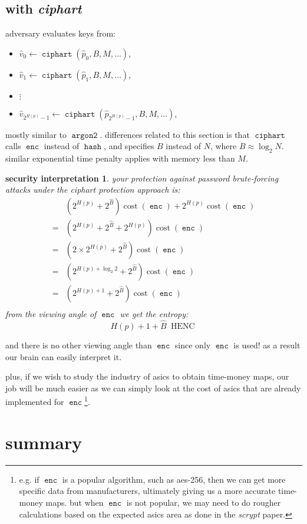 \documentclass[twocolumn]{article}
\newtheorem{security}{security interpretation}
\DeclareMathOperator{\enc}{\mathtt{enc}}
\DeclareMathOperator{\hash}{\mathtt{hash}}
\DeclareMathOperator{\argon}{\mathtt{argon2}}
\DeclareMathOperator{\ciphart}{\mathtt{ciphart}}
\DeclareMathOperator{\cost}{cost}
\DeclareMathOperator{\henc}{\; HENC}
\begin{document}
\subsection{with \emph{ciphart}}
adversary evaluates keys from:
\begin{itemize}
    \item $\hat v_0 \gets \ciphart(\hat p_0, B, M, \ldots)$,
    \item $\hat v_1 \gets \ciphart(\hat p_1, B, M, \ldots)$,
    \item $\vdots$
    \item $\hat v_{2^{H(p)}-1} \gets \ciphart(\hat p_{2^{H(p)}-1}, B, M,
    \ldots)$,
\end{itemize}

mostly similar to $\argon$.  differences related to this section is that
$\ciphart$ calls $\enc$ instead of $\hash$, and specifies $B$ instead of
$N$, where $B \approx \log_2 N$.  similar exponential time penalty applies
with memory less than $M$.

\begin{security}
your protection against password brute-forcing attacks under the
\emph{ciphart} protection approach is:
\begin{align*}
        & \left(2^{H(p)} + 2^{\hat B}\right) \cost(\enc) + 2^{H(p)}
            \cost(\enc) \\
    ={} & \left(2^{H(p)} + 2^{\hat B} + 2^{H(p)}\right) \cost(\enc) \\
    ={} & \left(2\times2^{H(p)} + 2^{\hat B}\right) \cost(\enc) \\
    ={} & \left(2^{H(p) + \log_2 2} + 2^{\hat B}\right) \cost(\enc) \\
    ={} & \left(2^{H(p) + 1} + 2^{\hat B}\right) \cost(\enc) \\
\end{align*}
from the viewing angle of $\enc$ we get the entropy:
\[
    H(p) + 1 + \hat B \henc
\]
\end{security}

and there is no other viewing angle than $\enc$ since only $\enc$ is used!
as a result our brain can easily interpret it.  

plus, if we wish to study the industry of asics to obtain time-money maps,
our job will be much easier as we can simply look at the cost of asics that
are already implemented for $\enc$\footnote{e.g. if $\enc$ is a popular
algorithm, such as aes-256, then we can get more specific data from
manufacturers, ultimately giving us a more accurate time-money maps.  but
when $\enc$ is not popular, we may need to do rougher calculations based on
the expected asics area as done in the \emph{scrypt} paper.}.

\section{summary}
\end{document}
